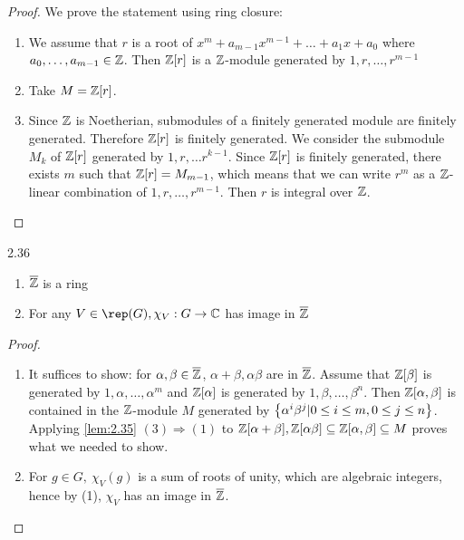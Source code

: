 \documentclass[twoside = false,	%
		headsepline,		%
		parskip = true,
		]{scrbook}						%
\begin{document}
    \begin{proof} We prove the statement using ring closure:
        \begin{enumerate}
            \item [$(1)\Rightarrow (2)$] We assume that $r$ is a root of $x^m+a_{m-1}x^{m-1}+\dots+a_1x+a_0$ where $a_0,\dots,a_{m-1}\in\mathbb Z$. Then $\mathbb Z[r]$ is a $\mathbb Z$-module generated by $1,r,\dots,r^{m-1}$
            \item[$(2)\Rightarrow (3)$] Take $M=\mathbb Z[r]$.
            \item[$(3)\Rightarrow (1)$] Since $\mathbb Z$ is Noetherian, submodules of a finitely generated module are finitely generated.
            Therefore $\mathbb Z[r]$ is finitely generated.
            We consider the submodule $M_k$ of $\mathbb Z[r]$ generated by $1,r,\dots r^{k-1}$. Since $\mathbb Z[r]$ is finitely generated, there exists $m$ such that $\mathbb Z[r]=M_{m-1}$, which means that we can write $r^m$ as a $\mathbb Z$-linear combination of $1,r,\dots,r^{m-1}$. Then $r$ is integral over $\mathbb Z$.
        \end{enumerate}
    \end{proof}
    
    \begin{corollary}{}{2.36}
        \begin{enumerate}
            \item $\overline{\mathbb Z}$ is a ring
            \item For any $V\in\rep(G), \chi_V:G \to\C$ has image in $\overline{\mathbb Z}$
        \end{enumerate}
    \end{corollary}

    \begin{proof}
        \begin{enumerate}
            \item It suffices to show: for $\alpha,\beta\in\overline{\mathbb Z}$, $\alpha+\beta, \alpha\beta$ are in $\overline{\mathbb Z}$. Assume that $\mathbb Z[\beta]$ is generated by $1,\alpha,\dots,\alpha^m$ and $\mathbb Z[\alpha]$ is generated by $1,\beta,\dots,\beta^n$. Then $\mathbb Z[\alpha,\beta]$ is contained in the $\mathbb Z$-module $M$ generated by $\left\{ \alpha^i\beta^j|0\leq i\leq m, 0\leq j\leq n\right\}$. Applying \ref{lem:2.35} $(3)\Rightarrow (1)$ to $\mathbb Z[\alpha+\beta], \mathbb Z[\alpha\beta]\subseteq\mathbb Z[\alpha,\beta]\subseteq M$ proves what we needed to show.
            \item For $g\in G,\ \chi_V(g)$ is a sum of roots of unity, which are algebraic integers, hence by (1), $\chi_V$ has an image in $\overline{\mathbb Z}$.
        \end{enumerate}
    \end{proof}
    
\end{document}

